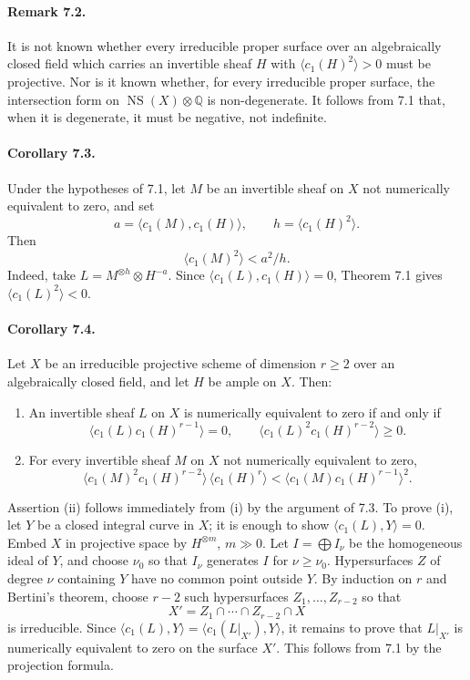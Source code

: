 \documentclass[11pt]{article}
\theoremstyle{plain}
\theoremstyle{definition}
\theoremstyle{remark}
\newcommand{\QQ}{\mathbb Q}
\providecommand{\NS}{\operatorname{NS}}
\begin{document}
\paragraph{Remark 7.2.}
It is not known whether every irreducible proper surface over an algebraically closed field which carries an invertible sheaf $H$ with $\langle c_1(H)^2\rangle>0$ must be projective. Nor is it known whether, for every irreducible proper surface, the intersection form on $\NS(X)\otimes\QQ$ is non-degenerate. It follows from 7.1 that, when it is degenerate, it must be negative, not indefinite.

\paragraph{Corollary 7.3.}
Under the hypotheses of 7.1, let $M$ be an invertible sheaf on $X$ not numerically equivalent to zero, and set
\[
a=\langle c_1(M),c_1(H)\rangle,\qquad h=\langle c_1(H)^2\rangle.
\]
Then
\[
\langle c_1(M)^2\rangle < a^2/h.
\]
Indeed, take $L=M^{\otimes h}\otimes H^{-a}$. Since $\langle c_1(L),c_1(H)\rangle=0$, Theorem 7.1 gives $\langle c_1(L)^2\rangle<0$.

\paragraph{Corollary 7.4.}
Let $X$ be an irreducible projective scheme of dimension $r\geq2$ over an algebraically closed field, and let $H$ be ample on $X$. Then:
\begin{enumerate}[label=\roman*)]
\item An invertible sheaf $L$ on $X$ is numerically equivalent to zero if and only if
\[
\langle c_1(L)c_1(H)^{r-1}\rangle=0,\qquad
\langle c_1(L)^2c_1(H)^{r-2}\rangle\geq0.
\]
\item For every invertible sheaf $M$ on $X$ not numerically equivalent to zero,
\[
\langle c_1(M)^2c_1(H)^{r-2}\rangle\,
\langle c_1(H)^r\rangle
<
\langle c_1(M)c_1(H)^{r-1}\rangle^2.
\]
\end{enumerate}

Assertion (ii) follows immediately from (i) by the argument of 7.3. To prove (i), let $Y$ be a closed integral curve in $X$; it is enough to show $\langle c_1(L),Y\rangle=0$. Embed $X$ in projective space by $H^{\otimes m}$, $m\gg0$. Let $I=\bigoplus I_\nu$ be the homogeneous ideal of $Y$, and choose $\nu_0$ so that $I_\nu$ generates $I$ for $\nu\geq\nu_0$. Hypersurfaces $Z$ of degree $\nu$ containing $Y$ have no common point outside $Y$. By induction on $r$ and Bertini's theorem, choose $r-2$ such hypersurfaces $Z_1,\ldots,Z_{r-2}$ so that
\[
X'=Z_1\cap\cdots\cap Z_{r-2}\cap X
\]
is irreducible. Since $\langle c_1(L),Y\rangle=\langle c_1(L|_{X'}),Y\rangle$, it remains to prove that $L|_{X'}$ is numerically equivalent to zero on the surface $X'$. This follows from 7.1 by the projection formula.
\end{document}
